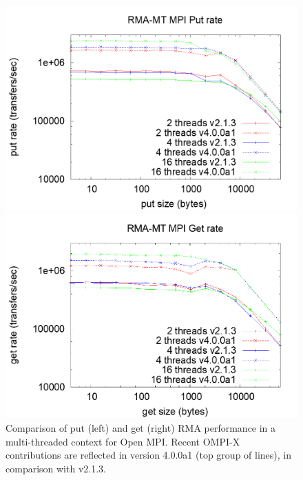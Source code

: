 \begin{figure}
\begin{minipage}[c]{2in}
\vspace{0pt}
\includegraphics[width=\textwidth]{projects/2.3.1-PMR/2.3.1.11-OMPI-X/pritchard-rma-mt-put-rate.png}
\end{minipage}
\begin{minipage}[c]{2in}
\vspace{0pt}
\includegraphics[width=\textwidth]{projects/2.3.1-PMR/2.3.1.11-OMPI-X/pritchard-rma-mt-get-rate.png}
\end{minipage}
\caption{Comparison of put (left) and get (right) RMA performance in a
multi-threaded context for Open MPI.  Recent OMPI-X contributions are
reflected in version 4.0.0a1 (top group of lines), in comparison with
v2.1.3.}
\label{fig:ompix-rma}
\end{figure}

